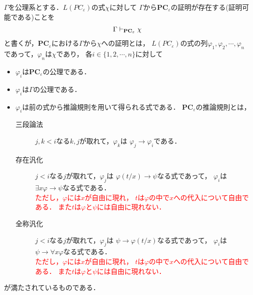 \begin{description}
	$\Gamma$を公理系とする．$L(PC_{\varepsilon})$の式$\chi$に対して
	$\Gamma$から{\bf PC}${}_{\varepsilon}$の証明が存在する(証明可能である)ことを
	\begin{align}
		\Gamma \vdash_{{\scriptsize \mbox{{\bf PC}${}_{\varepsilon}$}}} \chi
	\end{align}
	と書くが，{\bf PC}${}_{\varepsilon}$における$\Gamma$から$\chi$への証明とは，
	$L(PC_{\varepsilon})$の式の列$\varphi_{1},\varphi_{2},
	\cdots,\varphi_{n}$であって，$\varphi_{n}$は$\chi$であり，
	各$i \in \{1,2,\cdots,n\}$に対して
	\begin{itemize}
		\item $\varphi_{i}$は{\bf PC}${}_{\varepsilon}$の公理である．
		\item $\varphi_{i}$は$\Gamma$の公理である．
		\item $\varphi_{i}$は前の式から推論規則を用いて得られる式である．
			{\bf PC}${}_{\varepsilon}$の推論規則とは，
			\begin{description}
			\item[三段論法]
				$j,k < i$なる$k,j$が取れて，$\varphi_{k}$は
				$\varphi_{j} \rightarrow \varphi_{i}$である．
			 	
			\item[存在汎化] 
				$j < i$なる$j$が取れて，$\varphi_{j}$は
				$\varphi(t/x) \rightarrow \psi$なる式であって，
				$\varphi_{i}$は$\exists x \varphi \rightarrow \psi$なる式である．
				\\ \textcolor{red}{ただし，$\varphi$には$x$が自由に現れ，
				$t$は$\varphi$の中で$x$への代入について自由である．
				また$t$は$\varphi$と$\psi$には自由に現れない．}
			
			\item[全称汎化] 
				$j < i$なる$j$が取れて，$\varphi_{j}$は
				$\psi \rightarrow \varphi(t/x)$なる式であって，
				$\varphi_{i}$は$\psi \rightarrow \forall x \varphi$なる式である．
				\\ \textcolor{red}{ただし，$\varphi$には$x$が自由に現れ，
				$t$は$\varphi$の中で$x$への代入について自由である．
				また$t$は$\varphi$と$\psi$には自由に現れない．}
		\end{description} 
	\end{itemize}
	が満たされているものである．
	\end{description}